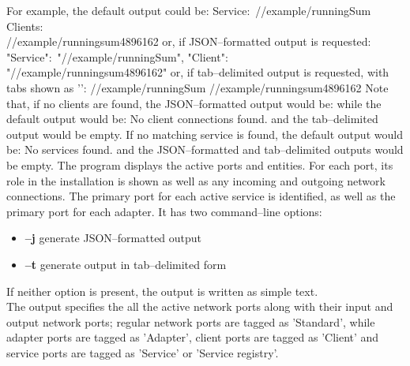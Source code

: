 For example, the default output could be:
\outputBegin{}
Service:\ /\serviceName/example/runningSum\\
\settowidth{\utilLen}{Service:\ }%
Clients:\\
\hspace*{\utilLen}/\clientName/example/runningsum\textunderscore{}4896162
\outputEnd{}
or, if JSON--formatted output is requested:
\outputBegin{}
\openSq{} \textbraceleft{} "Service":\ "/\serviceName/example/runningSum", "Client":\ \\
"/\clientName/example/runningsum\textunderscore{}4896162" \textbraceright{} \closeSq
\outputEnd{}
or, if tab--delimited output is requested, with tabs shown as
'\texttt{\boldmath{$\vdash$}}':
\outputBegin{}
/\serviceName/example/runningSum\pseudotab{}%
/\clientName/example/runningsum\textunderscore{}4896162
\outputEnd{}
Note that, if no clients are found, the JSON--formatted output would be:
\outputBegin{}
\sqPair
\outputEnd{}
while the default output would be:
\outputBegin{}
No client connections found.
\outputEnd{}
and the tab--delimited output would be empty.
If no matching service is found, the default output would be:
\outputBegin{}
No services found.
\outputEnd{}
and the JSON--formatted and tab--delimited outputs would be empty.
The program  displays the active \yarp{} ports and \mplusm{}
entities.
For each \yarp{} port, its role in the \mplusm{} installation is shown as well as any
incoming and outgoing \yarp{} network connections.
The primary port for each active service is identified, as well as the primary port for
each adapter.
It has two command--line options:
\begin{itemize}
\item \textbf{--j} generate JSON--formatted output
\item \textbf{--t} generate output in tab--delimited form
\end{itemize}
If neither option is present, the output is written as simple text.\\

The output specifies the all the active \yarp{} network ports along with their input and
output \yarp{} network ports; regular \yarp{} network ports are tagged as 'Standard',
while \mplusm{} adapter ports are tagged as 'Adapter', \mplusm{} client ports are tagged
as 'Client' and \mplusm{} service ports are tagged as 'Service' or 'Service registry'.\\

